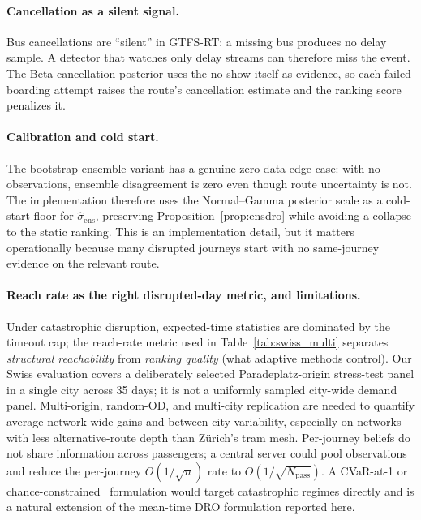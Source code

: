 \documentclass[opre,dblanonrev]{informs4}
\begin{document}
\paragraph{Cancellation as a silent signal.}
Bus cancellations are ``silent'' in GTFS-RT: a missing bus produces
no delay sample. A detector that watches only delay streams can
therefore miss the event. The Beta cancellation posterior uses the
no-show itself as evidence, so each failed boarding attempt raises the
route's cancellation estimate and the ranking score penalizes it.

\paragraph{Calibration and cold start.}
The bootstrap ensemble variant has a genuine zero-data edge case:
with no observations, ensemble disagreement is zero even though route
uncertainty is not. The implementation therefore uses the
Normal--Gamma posterior scale as a cold-start floor for
$\hat\sigma_{\mathrm{ens}}$, preserving
Proposition~\ref{prop:ensdro} while avoiding a collapse to the static
ranking. This is an implementation detail, but it matters
operationally because many disrupted journeys start with no
same-journey evidence on the relevant route.

\paragraph{Reach rate as the right disrupted-day metric, and limitations.}
Under catastrophic disruption, expected-time statistics are
dominated by the timeout cap; the reach-rate metric used in
Table~\ref{tab:swiss_multi} separates \emph{structural
reachability} from \emph{ranking quality} (what adaptive methods
control). Our Swiss evaluation covers a deliberately selected
Paradeplatz-origin stress-test panel in a single city across 35 days;
it is not a uniformly sampled city-wide demand panel. Multi-origin,
random-OD, and multi-city replication are needed to quantify average
network-wide gains and between-city variability, especially on
networks with less alternative-route depth than Z\"urich's tram mesh.
Per-journey
beliefs do not share information across passengers; a central
server could pool observations and reduce the per-journey
$O(1/\sqrt n)$ rate to $O(1/\sqrt{N_{\mathrm{pass}}})$. A
CVaR-at-1 or chance-constrained~\citep{chow2015} formulation would
target catastrophic regimes directly and is a natural extension of
the mean-time DRO formulation reported here.
\end{document}
